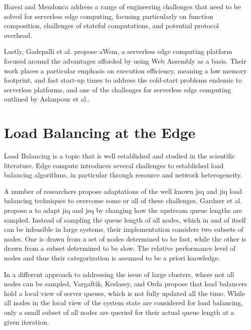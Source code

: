 \documentclass[draft,final]{vutinfth} %
\begin{document}
Baresi and Mendonca\cite{baresiServerlessPlatformEdge2019} address a range of engineering challenges that need to be solved for serverless edge computing, focusing particularly on function composition, challenges of stateful computations, and potential protocol overhead.

Lastly, Gadepalli et al. \cite{gadepalliChallengesOpportunitiesEfficient2019} propose aWsm, a serverless edge computing platform focused around the advantages afforded by using Web Assembly as a basis.
Their work places a particular emphasis on execution efficiency, meaning a low memory footprint, and fast start-up times to address the cold-start problems endemic to serverless platforms, and one of the challenges for serverless edge computing outlined by Aslanpour et al.\cite{aslanpourServerlessEdgeComputing2021}.


\section{Load Balancing at the Edge}
Load Balancing is a topic that is well established and studied in the scientific literature.
Edge compute introduces several challenges to established load balancing algorithms, in particular through resource and network heterogeneity\cite{gardnerScalableLoadBalancing2021}.

A number of researchers propose adaptations of the well known \gls{jsq} and \gls{jiq} load balancing techniques to overcome some or all of these challenges\cite{gardnerScalableLoadBalancing2021}\cite{wengOptimalLoadBalancing2020}\cite{vargaftikLSQLoadBalancing2020}.
Gardner et al. propose a to adapt \gls{jiq} and \gls{jsq} by changing how the upstream queue lengths are sampled.
Instead of sampling the queue length of all nodes, which in and of itself can be infeasible in large systems\cite{gardnerScalableLoadBalancing2021}, their implementation considers two subsets of nodes.
One is drawn from a set of nodes determined to be fast, while the other is drawn from a subset determined to be slow.
The relative performance level of nodes and thus their categorization is assumed to be a priori knowledge.

In a different approach to addressing the issue of large clusters, where not all nodes can be sampled, Vargaftik, Keslassy, and Orda propose that load balancers hold a local view of server queues, which is not fully updated all the time\cite{vargaftikLSQLoadBalancing2020}.
While all nodes in the local view of the system state are considered for load balancing, only a small subset of all nodes are queried for their actual queue length at a given iteration.
\end{document}
